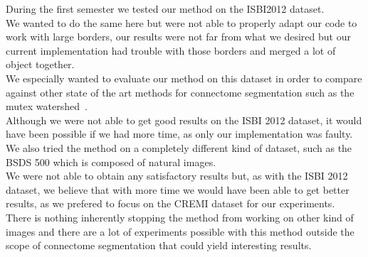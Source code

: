 During the first semester we tested our method on the ISBI2012 dataset.\\
We wanted to do the same here but were not able to properly adapt our code to
work with large borders, our results were not far from what we desired but our
current implementation had trouble with those borders and merged a lot of
object together.\\

We especially wanted to evaluate our method on this dataset in order to compare
against other state of the art methods for connectome segmentation such
as the mutex watershed~\cite{wolf_mutex_2019}.\\

Although we were not able to get good results on the ISBI 2012 dataset, it
would have been possible if we had more time, as only our implementation was
faulty.\\

We also tried the method on a completely different kind of dataset, such as the
BSDS 500 which is composed of natural images.\\
We were not able to obtain any satisfactory results but, as with the ISBI 2012
dataset, we believe that with more time we would have been able to get better
results, as we prefered to focus on the CREMI dataset for our experiments.\\

There is nothing inherently stopping the method from working on other kind of
images and there are a lot of experiments possible with this method outside the
scope of connectome segmentation that could yield interesting results.

